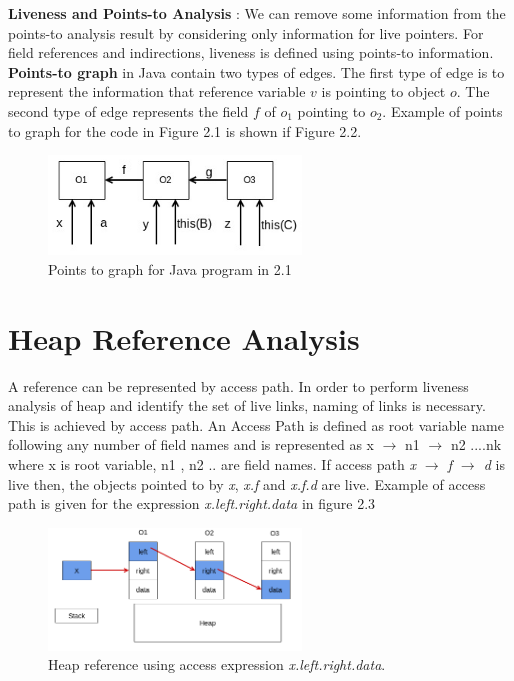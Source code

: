 {\bfseries Liveness and Points-to Analysis} : We can remove some information from the points-to analysis result by considering only information for live pointers. For field references and indirections, liveness is defined using points-to information. \cite{liveness} \\

{\bfseries Points-to graph} in Java contain two types of edges. The first type of edge is to represent the information that reference variable $v$  is pointing to object $o$. The second type of edge represents the field $f$ of $o_1$ pointing to $o_2$. Example of points to graph for the code in Figure 2.1 is shown if Figure 2.2. \\

\begin{figure}
	\centering
	\includegraphics[width=0.6\textwidth]{Figures/rsz_points_to_graph.png}
	\caption{Points to graph for Java program in 2.1}
	\label{fig:points-to java}
\end{figure}

\section{Heap Reference Analysis}

A reference can be represented by access path. In order to perform liveness analysis of heap and identify the set of live links, naming of links is necessary. This is achieved by access path. An Access Path is defined as root variable name following any number of field names and is represented as x $\rightarrow$ n1 $\rightarrow$ n2 ....nk where x is root variable, n1 , n2 .. are field names. If access path \emph{x $\rightarrow$ f $\rightarrow$ d} is live then, the objects pointed to by \emph{x}, \emph{x.f} and \emph{x.f.d} are live. Example of access path is given for the expression \emph{x.left.right.data} in figure 2.3 \\
 
\begin{figure}
	\centering
	\includegraphics[width=0.6\textwidth]{Figures/hra_access_path.png}
	\caption{Heap reference using access expression \emph{x.left.right.data}.}
	\label{fig:access_path_example}
\end{figure}

